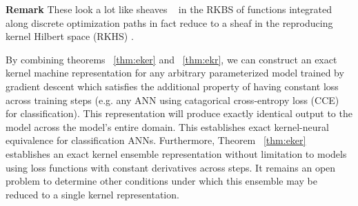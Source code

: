 \textbf{Remark} These look a lot like sheaves ~\citep{huybrechts2010geometry} in the RKBS of functions integrated along discrete optimization paths in fact reduce to a sheaf in the reproducing kernel Hilbert space (RKHS) \citep{shilton_gradient_2023}. 

By combining theorems ~\ref{thm:eker} and ~\ref{thm:ekr}, we can construct an exact kernel machine representation for any arbitrary parameterized model trained by gradient descent which satisfies the additional property of having constant loss across training steps (e.g. any ANN using catagorical cross-entropy loss (CCE) for classification). This representation will produce exactly identical output to the model across  the model's entire domain. This establishes exact kernel-neural equivalence for classification ANNs. Furthermore, Theorem ~\ref{thm:eker} establishes an exact kernel ensemble representation without limitation to models using loss functions with constant derivatives across steps. It remains an open problem to determine other conditions under which this ensemble may be reduced to a single kernel representation.  




